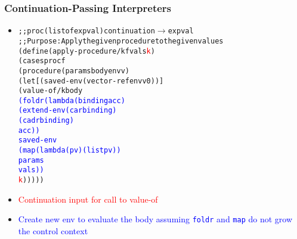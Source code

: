 \documentclass{beamer}
\newcommand{\arrow}{\(\rightarrow\)}
\begin{document}
\begin{frame}[fragile]
\frametitle{Continuation-Passing Interpreters}
\begin{scriptsize}
\begin{itemize}
\item<1-> 
\begin{alltt}
;; proc (listof expval) continuation \arrow{} expval
;; Purpose: Apply the given procedure to the given values
(define (apply-procedure/k f vals \textcolor{red}{k})
  (cases proc f
    (procedure (params body envv)
               (let [(saved-env (vector-ref envv 0))]
                 (value-of/k body
                             \textcolor{blue}{(foldr (lambda (binding acc)
                                      (extend-env (car binding)
                                                  (cadr binding)
                                                  acc))
                                    saved-env
                                    (map (lambda (p v) (list p v))
                                         params
                                         vals))}
                             \textcolor{red}{k})))))
\end{alltt}

\item<1-> \textcolor{red}{Continuation input for call to value-of}

\item<1-> \textcolor{blue}{Create new env to evaluate the body assuming \texttt{foldr} and \texttt{map} do not grow the control context}

\end{itemize}
\end{scriptsize}
\end{frame}
\end{document}
